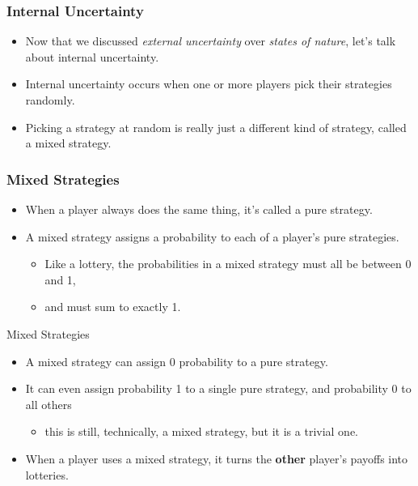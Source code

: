 
\begin{frame}
\frametitle{Internal Uncertainty}
\begin{itemize}
  
  \item Now that we discussed \textit{external uncertainty} over \textit{states of nature},
  let's talk about \alert{internal uncertainty}.

	\item Internal uncertainty occurs when one or more players pick their strategies randomly.

	\item Picking a strategy at random is really just a different kind of strategy, called a \alert{mixed strategy}.
\end{itemize}
\end{frame}

\begin{frame}
\frametitle{Mixed Strategies}
\begin{itemize}

	\item When a player always does the same thing, it's called a \alert{pure strategy}.
  
  \item A \alert{mixed strategy} assigns a probability to each of a player's pure strategies. 

  \begin{itemize}
    \item Like a lottery, the probabilities in a mixed strategy must all be between 0 and 1,
    \item and must sum to exactly 1.
  \end{itemize}
\end{itemize}
\end{frame}

\begin{frame}{Mixed Strategies}

\begin{itemize}

  \item A mixed strategy can assign 0 probability to a pure strategy.

  \item It can even assign probability 1 to a single pure strategy, and probability 0 to all others
  
  \begin{itemize}
    \item this is still, technically, a mixed strategy, but it is a trivial one.
  \end{itemize}

	\item When a player uses a mixed strategy, it turns the \textbf{other} player's payoffs into lotteries.
  
\end{itemize}
\end{frame}

